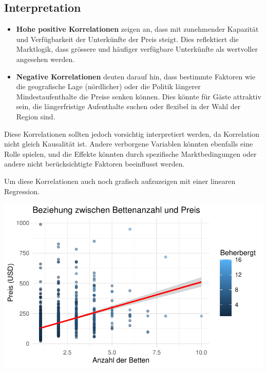 \documentclass[
  journal,
]{IEEEtran}%
\begin{document}
\hypertarget{interpretation}{%
\subsection{\texorpdfstring{\textbf{Interpretation}}{Interpretation}}\label{interpretation}}

\begin{itemize}
\item
  \textbf{Hohe positive Korrelationen} zeigen an, dass mit zunehmender
  Kapazität und Verfügbarkeit der Unterkünfte der Preis steigt. Dies
  reflektiert die Marktlogik, dass grössere und häufiger verfügbare
  Unterkünfte als wertvoller angesehen werden.
\item
  \textbf{Negative Korrelationen} deuten darauf hin, dass bestimmte
  Faktoren wie die geografische Lage (nördlicher) oder die Politik
  längerer Mindestaufenthalte die Preise senken können. Dies könnte für
  Gäste attraktiv sein, die längerfristige Aufenthalte suchen oder
  flexibel in der Wahl der Region sind.
\end{itemize}

Diese Korrelationen sollten jedoch vorsichtig interpretiert werden, da
Korrelation nicht gleich Kausalität ist. Andere verborgene Variablen
könnten ebenfalls eine Rolle spielen, und die Effekte könnten durch
spezifische Marktbedingungen oder andere nicht berücksichtigte Faktoren
beeinflusst werden.

Um diese Korrelationen auch noch grafisch aufzuzeigen mit einer linearen
Regression.

\includegraphics{main_files/figure-pdf/unnamed-chunk-8-1.pdf}
\end{document}
